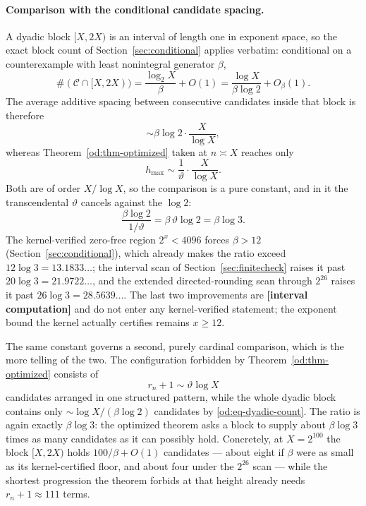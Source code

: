 \documentclass[11pt,oneside]{article}
\theoremstyle{definition}
\theoremstyle{remark}
\newcommand{\thetaq}{\vartheta}
\newcommand{\Cand}{\mathcal C}
\newcommand{\statuscomp}{\textcolor{computeviolet}{\textbf{[interval computation]}}}
\begin{document}
\paragraph{Comparison with the conditional candidate spacing.}
A dyadic block $[X,2X)$ is an interval of length one in exponent space, so the exact block
count of Section~\ref{sec:conditional} applies verbatim: conditional on a counterexample with
least nonintegral generator $\beta$,
\begin{equation}
 \#(\Cand\cap[X,2X))
 =\frac{\log_2X}{\beta}+O(1)
 =\frac{\log X}{\beta\log2}+O_\beta(1).
 \label{od:eq-dyadic-count}
\end{equation}
The average additive spacing between consecutive candidates inside that block is therefore
\[
 \sim\beta\log2\cdot\frac{X}{\log X},
\]
whereas Theorem~\ref{od:thm-optimized} taken at $n\asymp X$ reaches only
\[
 h_{\max}\sim\frac1\thetaq\cdot\frac{X}{\log X}.
\]
Both are of order $X/\log X$, so the comparison is a pure constant, and in it the
transcendental $\thetaq$ cancels against the $\log2$:
\begin{equation}
 \frac{\beta\log2}{1/\thetaq}
 =\beta\,\thetaq\log2
 =\beta\log3 .
 \label{od:eq-spacing-ratio}
\end{equation}
The kernel-verified zero-free region $2^x<4096$ forces $\beta>12$ (Section~\ref{sec:conditional}),
which already makes the ratio exceed $12\log3=13.1833\ldots$; the interval scan of
Section~\ref{sec:finitecheck} raises it past $20\log3=21.9722\ldots$, and the extended
directed-rounding scan through $2^{26}$ raises it past $26\log3=28.5639\ldots$.  The last two
improvements are \statuscomp{} and do not enter any kernel-verified statement; the exponent
bound the kernel actually certifies remains $x\ge12$.

The same constant governs a second, purely cardinal comparison, which is the more telling of
the two.  The configuration forbidden by Theorem~\ref{od:thm-optimized} consists of
\[
 r_n+1\sim\thetaq\log X
\]
candidates arranged in one structured pattern, while the whole dyadic block contains only
$\sim\log X/(\beta\log2)$ candidates by \eqref{od:eq-dyadic-count}.  The ratio is again
exactly $\beta\log3$: the optimized theorem asks a block to supply about $\beta\log3$ times
as many candidates as it can possibly hold.  Concretely, at $X=2^{100}$ the block $[X,2X)$
holds $100/\beta+O(1)$ candidates --- about eight if $\beta$ were as small as its
kernel-certified floor, and about four under the $2^{26}$ scan --- while the shortest
progression the theorem forbids at that height already needs $r_n+1\approx111$ terms.
\end{document}
